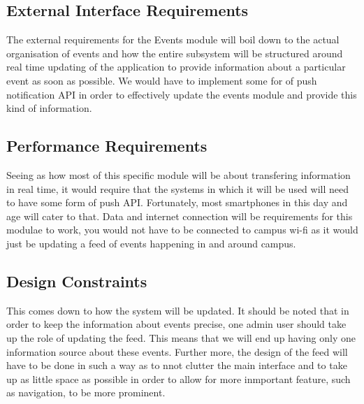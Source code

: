 \documentclass{article}
\begin{document}
			\subsection{External Interface Requirements}
					The external requirements for the Events module will boil down to the actual organisation of events and how the entire subsystem will be structured around real time updating of the application to provide information about a particular event as soon as possible. We would have to implement some for of push notification API in order to effectively update the events module and provide this kind of information.

			\subsection{Performance Requirements}
					Seeing as how most of this specific module will be about transfering information in real time, it would require that the systems in which it will be used will need to have some form of push API. Fortunately, most smartphones in this day and age will cater to that. Data and internet connection will be requirements for this modulae to work, you would not have to be connected to campus wi-fi as it would just be updating a feed of events happening in and around campus.

			\subsection{Design Constraints}
					This comes down to how the system will be updated. It should be noted that in order to keep the information about events precise, one admin user should take up the role of updating the feed. This means that we will end up having only one information source about these events. Further more, the design of the feed will have to be done in such a way as to nnot clutter the main interface and to take up as little space as possible in order to allow for more inmportant feature, such as navigation, to be more prominent.
			\begin{itemize}
				
				
			\end{itemize}
\end{document}
